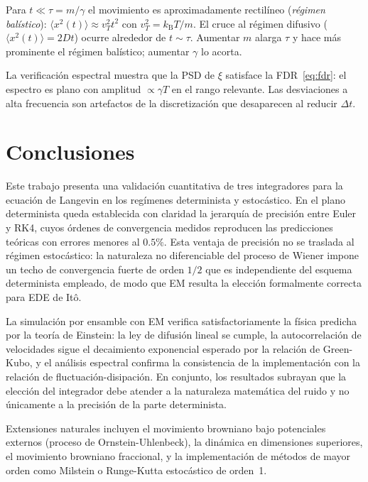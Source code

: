 \documentclass[aps,prl,twocolumn,showpacs,superscriptaddress,longbibliography]{revtex4-2}
\newcommand{\kB}{k_{\mathrm{B}}}
\newcommand{\MSD}{\langle x^2(t) \rangle}
\newcommand{\dt}{\Delta t}
\begin{document}
	Para $t\ll\tau=m/\gamma$ el movimiento es aproximadamente rectilíneo
	(\textit{régimen balístico}): $\MSD\approx v_T^2 t^2$ con
	$v_T^2=\kB T/m$.  El cruce al régimen difusivo ($\MSD=2Dt$) ocurre
	alrededor de $t\sim\tau$.  Aumentar $m$ alarga $\tau$ y hace más
	prominente el régimen balístico; aumentar $\gamma$ lo acorta.
	
	La verificación espectral muestra que la PSD de $\xi$ satisface la
	FDR~\eqref{eq:fdr}: el espectro es plano con amplitud $\propto\gamma T$
	en el rango relevante.  Las desviaciones a alta frecuencia son
	artefactos de la discretización que desaparecen al reducir $\dt$.
	
	\section{Conclusiones}
	\label{sec:conclusiones}
	
	Este trabajo presenta una validación cuantitativa de tres integradores
	para la ecuación de Langevin en los regímenes determinista y estocástico.
	En el plano determinista queda establecida con claridad la jerarquía de
	precisión entre Euler y RK4, cuyos órdenes de convergencia medidos
	reproducen las predicciones teóricas con errores menores al $0.5\%$.
	Esta ventaja de precisión no se traslada al régimen estocástico: la
	naturaleza no diferenciable del proceso de Wiener impone un techo de
	convergencia fuerte de orden $1/2$ que es independiente del esquema
	determinista empleado, de modo que EM resulta la elección formalmente
	correcta para EDE de Itô.
	
	La simulación por ensamble con EM verifica satisfactoriamente la física
	predicha por la teoría de Einstein: la ley de difusión lineal se cumple,
	la autocorrelación de velocidades sigue el decaimiento exponencial
	esperado por la relación de Green-Kubo, y el análisis espectral confirma
	la consistencia de la implementación con la relación de
	fluctuación-disipación.  En conjunto, los resultados subrayan que la
	elección del integrador debe atender a la naturaleza matemática del ruido
	y no únicamente a la precisión de la parte determinista.
	
	Extensiones naturales incluyen el movimiento browniano bajo potenciales
	externos (proceso de Ornstein-Uhlenbeck), la dinámica en dimensiones
	superiores, el movimiento browniano fraccional, y la implementación de
	métodos de mayor orden como Milstein o Runge-Kutta estocástico de
	orden~1.

	
	
\end{document}

